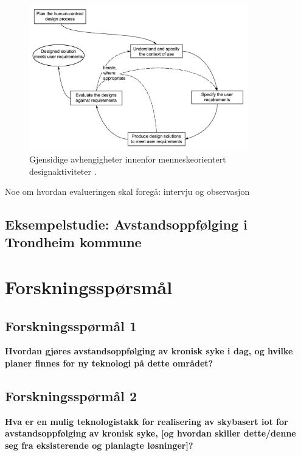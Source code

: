 \begin{figure}
\centering
\includegraphics[width=0.85\textwidth]{fig/iso9241-210}
\caption{Gjensidige avhengigheter innenfor menneskeorientert designaktiviteter \citep{dis20099241}.}
\label{fig:iso9241-210}
\end{figure}

Noe om hvordan evalueringen skal foregå: intervju og observasjon


\subsection{Eksempelstudie: Avstandsoppfølging i Trondheim kommune}



\section{Forskningsspørsmål}
\subsection{Forskningsspørmål 1}
\textbf{Hvordan gjøres avstandsoppfølging av kronisk syke i dag, og hvilke planer finnes for ny teknologi på dette området?}

\subsection{Forskningsspørmål 2}
\textbf{Hva er en mulig teknologistakk for realisering av skybasert \gls{iot} for avstandsoppfølging av kronisk syke,
    [og hvordan skiller dette/denne seg fra eksisterende og planlagte løsninger]?}
    
